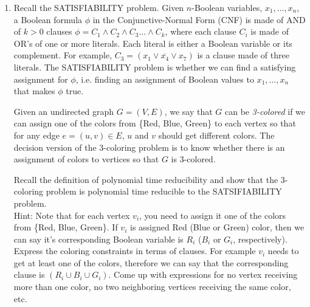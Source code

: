 \documentclass[12pt]{article}
\begin{document}
\begin{enumerate}
\item Recall  the SATISFIABILITY problem. Given $n$-Boolean variables, $x_1, \dots, x_n$, a Boolean formula $\phi$ in the Conjunctive-Normal Form (CNF) is made of AND of $k>0$ clauses $\phi=C_1 \wedge C_2\wedge C_3\dots \wedge C_k$, where each clause $C_i$ is made of OR's of one or more literals. Each literal is either a Boolean variable or its complement. For example, $C_3=(x_1\vee \overline{x_4} \vee {x_7})$ is a clause made of three literals.  The SATISFIABILITY problem is whether we can find a satisfying assignment for $\phi$, i.e. finding an assignment of Boolean values to $x_1,\dots,x_n$ that makes $\phi$ true.    

Given an undirected graph $G=(V,E)$, we say that $G$ can be {\em 3-colored} if we can assign one of the colors from  \{Red, Blue, Green\} to each vertex  so that for any edge $e=(u,v)\in E$,  $u$ and $v$  should get different colors. The decision version of the 3-coloring problem is to know whether there is an assignment of colors to vertices so that $G$ is 3-colored.  

Recall the definition of polynomial time reducibility and show that the 3-coloring problem is polynomial time reducible to the SATSIFIABILITY problem. \\ 
Hint:  Note that for each vertex $v_i$, you need to assign it one of the colors from \{Red, Blue, Green\}. If $v_i$ is assigned Red (Blue or Green) color, then we can say it's corresponding Boolean variable is $R_i$ ($B_i$ or $G_i$, respectively).  Express the coloring constraints in terms of clauses. For example $v_i$ needs to get at least one of the colors, therefore we can say that the corresponding clause is $(R_i\cup B_i\cup G_i)$. Come up with expressions for no vertex receiving more than one color, no two neighboring vertices receiving the same color, etc.  
\end{enumerate}
\end{document}
